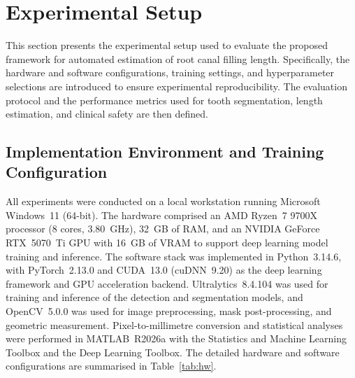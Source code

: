 

\section{Experimental Setup}

This section presents the experimental setup used to evaluate the proposed
framework for automated estimation of root canal filling length. Specifically,
the hardware and software configurations, training settings,
and hyperparameter selections are introduced to ensure experimental
reproducibility. The evaluation protocol and the performance metrics used for
tooth segmentation, length estimation, and clinical safety are then defined.

\subsection{Implementation Environment and Training Configuration}

All experiments were conducted on a local workstation running Microsoft
Windows~11 (64-bit). The hardware comprised an AMD Ryzen~7 9700X processor
(8 cores, 3.80~GHz), 32~GB of RAM, and an NVIDIA GeForce RTX~5070~Ti GPU with
16~GB of VRAM to support deep learning model training and inference. The
software stack was implemented in Python~3.14.6, with PyTorch~2.13.0 and
CUDA~13.0 (cuDNN~9.20) as the deep learning framework and GPU acceleration
backend. Ultralytics~8.4.104 was used for training and inference of the
detection and segmentation models, and OpenCV~5.0.0 was used for image
preprocessing, mask post-processing, and geometric measurement.
Pixel-to-millimetre conversion and statistical analyses were performed in
MATLAB~R2026a with the Statistics and Machine Learning Toolbox and the Deep
Learning Toolbox. The detailed hardware and software configurations are
summarised in Table~\ref{tab:hw}.

